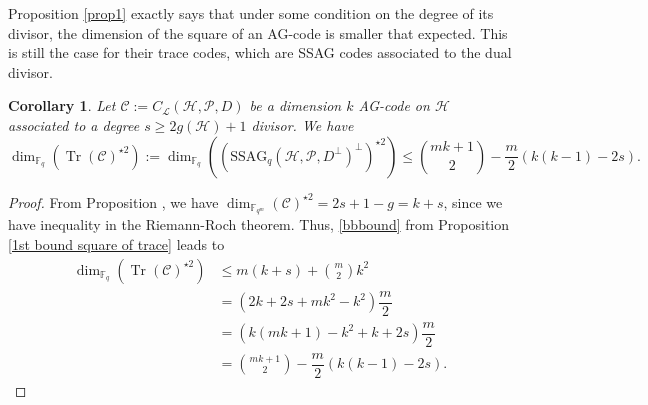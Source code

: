 \documentclass[a4paper]{article}
\newtheorem{coro1}{Corollary}
\newcommand{\calP}{\mathcal{P}}
\newcommand{\calH}{\mathcal{H}}
\newcommand{\calL}{\mathcal{L}}
\newcommand{\calC}{\mathcal{C}}
\newcommand{\Tr}{\operatorname{Tr}}
\newcommand{\fqm}{\mathbb{F}_{q^m}}
\newcommand{\fq}{\mathbb{F}_{q}}
\begin{document}
Proposition \ref{prop1} exactly says that under some condition on the degree of its divisor, the dimension of the square of an AG-code is smaller that expected. This is still the case for their trace codes, which are SSAG codes associated to the dual divisor.

\begin{coro1} \label{square_ssag_bound}
Let $\mathcal{C} := C_{\calL}(\calH,\mathcal{P},D)$ be a dimension $k$ AG-code on $\calH$ associated to a degree $s \geq 2g(\calH)+1$ divisor. We have 
\[ \dim_{\fq}(\Tr(\mathcal{C})^{\star2}) := \dim_{\fq} ((\mathrm{SSAG}_{q}(\calH,\calP,D^{\perp})^{\perp})^{\star2})  \leq \binom{mk+1}{2} - \dfrac{m}{2} (k(k-1)-2s).\]
\end{coro1}

\begin{proof}
From Proposition \label{Prop1}, we have $\dim_{\fqm}(\calC)^{\star2} = 2s+1-g = k+s$, since we have inequality in the Riemann-Roch theorem. Thus, \eqref{bbbound} from Proposition \ref{1st bound square of trace} leads to
\begin{align*}
    \dim_{\fq}(\Tr(\mathcal{C})^{\star2}) &\leq m(k+s) + \binom{m}{2}k^2 \\
                                        &= (2k+2s+mk^2-k^2) \dfrac{m}{2} \\
                                        &= (k(mk+1)-k^2+k+2s) \dfrac{m}{2} \\
                                        &= \binom{mk+1}{2} - \dfrac{m}{2}(k(k-1)-2s) .
\end{align*}
\end{proof}
\end{document}
